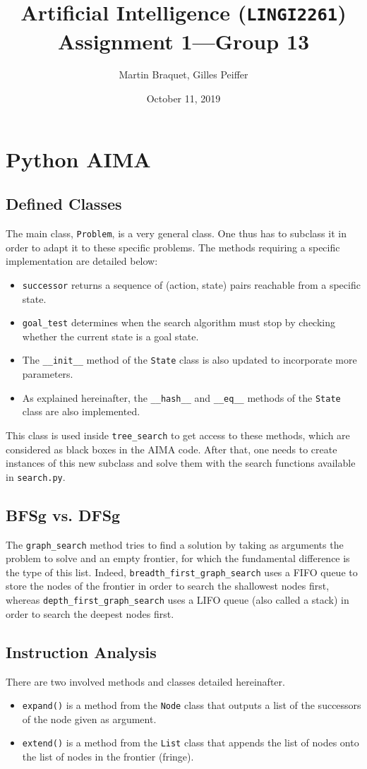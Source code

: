 \documentclass[journal]{IEEEtran}
\title{Artificial Intelligence (\texttt{LINGI2261}) \\ Assignment 1---Group 13}
\author{Martin Braquet, Gilles Peiffer}
\date{October 11, 2019}
\newcommand{\py}[1]{\texttt{#1}}
\begin{document}
\maketitle

\section{Python AIMA}
\subsection{Defined Classes}
The main class, \py{Problem}, is a very general class. One thus has to subclass it in order to adapt it to these specific problems.
 The methods requiring a specific implementation are detailed below:
 \begin{itemize}
  \item \py{successor} returns a sequence of (action, state) pairs reachable from a specific state.
  \item \py{goal_test} determines when the search algorithm must stop by checking whether the current state is a goal state.
  \item The \py{__init__} method of the \py{State} class is also updated to incorporate more parameters.
  \item As explained hereinafter, the \py{__hash__} and \py{__eq__} methods of the \py{State} class are also implemented.
 \end{itemize}
This class is used inside \py{tree_search} to get access to these methods, which are considered as black boxes in the AIMA code.
 After that, one needs to create instances of this new subclass and solve them with the search functions available in \py{search.py}.
 \subsection{BFSg vs. DFSg}
 The \py{graph_search} method tries to find a solution by taking as arguments the problem to solve and an empty frontier, for which the fundamental difference is the type of this list.
 Indeed, \py{breadth_first_graph_search} uses a FIFO queue to store the nodes of the frontier in order to search the shallowest nodes first, whereas \py{depth_first_graph_search} uses a LIFO queue  (also called a stack) in order to search the deepest nodes first.
 \subsection{Instruction Analysis}
 There are two involved methods and classes detailed hereinafter.
 \begin{itemize}
 	\item \py{expand()} is a method from the \py{Node} class that outputs a list of the successors of the node given as argument.
 	\item \py{extend()} is a method from the \py{List} class that appends the list of nodes onto the list of nodes in the frontier (fringe).
 \end{itemize}
\end{document}
